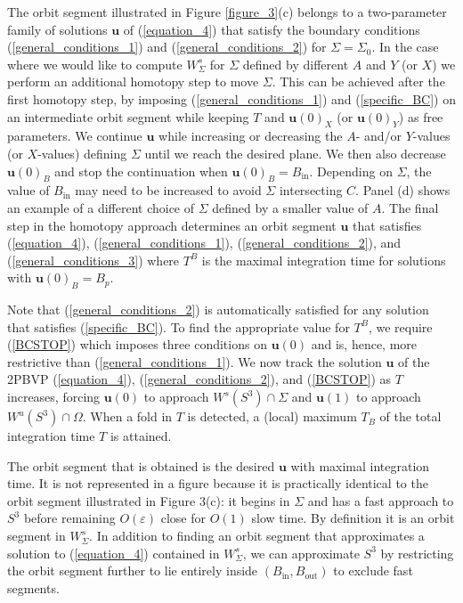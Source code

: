 \documentclass{ws-ijbc}
\begin{document}
The orbit segment illustrated in Figure \ref{figure_3}(c) belongs to a two-parameter family of solutions $\mathbf{u}$ of (\ref{equation_4}) that satisfy the boundary conditions (\ref{general_conditions_1}) and (\ref{general_conditions_2}) for $\Sigma=\Sigma_0$.  In the case where we would like to compute $W^{s}_{\Sigma}$ for $\Sigma$ defined by different $A$ and $Y$ (or $X$) we perform an additional homotopy step to move $\Sigma$.  This can be achieved after the first homotopy step, by imposing (\ref{general_conditions_1}) and (\ref{specific_BC}) on an intermediate orbit segment while keeping $T$ and $\mathbf{u}(0)_X$ (or $\mathbf{u}(0)_Y$) as free parameters.  We continue $\mathbf{u}$ while increasing or decreasing the $A$- and/or $Y$-values (or $X$-values) defining $\Sigma$ until we reach the desired plane.  We then also decrease $\mathbf{u}(0)_B$ and stop the continuation when $\mathbf{u}(0)_B = B_{\text{in}}$.  Depending on $\Sigma$, the value of $B_{\text{in}}$ may need to be increased to avoid $\Sigma$ intersecting $C$.  Panel (d) shows an example of a different choice of $\Sigma$ defined by a smaller value of $A$.  The final step in the homotopy approach determines an orbit segment $\mathbf{u}$ that satisfies (\ref{equation_4}), (\ref{general_conditions_1}), (\ref{general_conditions_2}), and (\ref{general_conditions_3}) where $T^B$ is the maximal integration time for solutions with $\mathbf{u}(0)_B=B_p$.

Note that (\ref{general_conditions_2}) is automatically satisfied for any solution that satisfies (\ref{specific_BC}).  To find the appropriate value for $T^B$, we require (\ref{BCSTOP}) which imposes three conditions on $\mathbf{u}(0)$ and is, hence, more restrictive than (\ref{general_conditions_1}).  We now track the solution $\mathbf{u}$ of the 2PBVP (\ref{equation_4}), (\ref{general_conditions_2}), and (\ref{BCSTOP}) as $T$ increases, forcing $\mathbf{u}(0)$ to approach $W^s(S^3)\cap\Sigma$ and $\mathbf{u}(1)$ to approach $W^u(S^3) \cap \Omega$. When a fold in $T$ is detected, a (local) maximum $T_B$ of the total integration time $T$ is attained.

The orbit segment that is obtained is the desired $\mathbf{u}$ with maximal integration time.  It is not represented in a figure because it is practically identical to the orbit segment illustrated in Figure 3(c): it begins in $\Sigma$ and has a fast approach to $S^3$ before remaining $O(\varepsilon)$ close for $O(1)$ slow time.  By definition it is an orbit segment in $W^{s}_{\Sigma}$.  In addition to finding an orbit segment that approximates a solution to (\ref{equation_4}) contained in $W^s_{\Sigma}$, we can approximate $S^3$ by restricting the orbit segment further to lie entirely inside $(B_{\text{in}},B_{\text{out}})$ to exclude fast segments.
\end{document}
